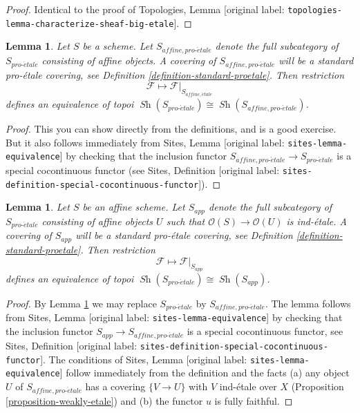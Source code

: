 \documentclass[10pt,a4paper]{article}
\theoremstyle{plain}
\newtheorem{lemma}[subsection]{Lemma}
\theoremstyle{definition}
\theoremstyle{remark}
\numberwithin{equation}{subsection}
\def\Sh{\mathop{\mathit{Sh}}\nolimits}
\def\proetale{{pro\text{-}\acute{e}tale}}
\def\etale{{\acute{e}tale}}
\begin{document}
\begin{proof}
Identical to the proof of
Topologies, Lemma \textnormal{[original label: \nolinkurl{topologies-lemma-characterize-sheaf-big-etale}]}.
\end{proof}

\begin{lemma}
\label{lemma-alternative}
Let $S$ be a scheme. Let $S_{affine, \proetale}$ denote the full subcategory
of $S_\proetale$ consisting of affine objects. A covering of
$S_{affine, \proetale}$ will be a standard pro-\'etale covering, see
Definition \ref{definition-standard-proetale}.
Then restriction
$$
\mathcal{F} \longmapsto \mathcal{F}|_{S_{affine, \etale}}
$$
defines an equivalence of topoi
$\Sh(S_\proetale) \cong \Sh(S_{affine, \proetale})$.
\end{lemma}

\begin{proof}
This you can show directly from the definitions, and is a good exercise.
But it also follows immediately from
Sites, Lemma \textnormal{[original label: \nolinkurl{sites-lemma-equivalence}]}
by checking that the inclusion functor
$S_{affine, \proetale} \to S_\proetale$
is a special cocontinuous functor (see
Sites, Definition \textnormal{[original label: \nolinkurl{sites-definition-special-cocontinuous-functor}]}).
\end{proof}

\begin{lemma}
\label{lemma-affine-alternative}
Let $S$ be an affine scheme. Let $S_{app}$ denote the full subcategory
of $S_\proetale$ consisting of affine objects $U$ such that
$\mathcal{O}(S) \to \mathcal{O}(U)$ is ind-\'etale. A covering of
$S_{app}$ will be a standard pro-\'etale covering, see
Definition \ref{definition-standard-proetale}.
Then restriction
$$
\mathcal{F} \longmapsto \mathcal{F}|_{S_{app}}
$$
defines an equivalence of topoi $\Sh(S_\proetale) \cong \Sh(S_{app})$.
\end{lemma}

\begin{proof}
By Lemma \ref{lemma-alternative} we may replace $S_\proetale$ by
$S_{affine, \proetale}$.
The lemma follows from Sites, Lemma \textnormal{[original label: \nolinkurl{sites-lemma-equivalence}]}
by checking that the inclusion functor $S_{app} \to S_{affine, \proetale}$
is a special cocontinuous functor, see
Sites, Definition \textnormal{[original label: \nolinkurl{sites-definition-special-cocontinuous-functor}]}.
The conditions of Sites, Lemma \textnormal{[original label: \nolinkurl{sites-lemma-equivalence}]}
follow immediately from the definition and the facts
(a) any object $U$ of $S_{affine, \proetale}$ has a covering
$\{V \to U\}$ with $V$ ind-\'etale over $X$
(Proposition \ref{proposition-weakly-etale})
and (b) the functor $u$ is fully faithful.
\end{proof}
\end{document}
